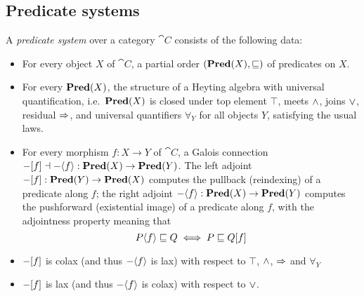 \subsection{Predicate systems}
\label{sec:predicate-system}

A \emph{predicate system} over a category $\cat{C}$ consists of the following data:
\begin{itemize}
\item For every object $X$ of $\cat{C}$, a partial order $(\mathbf{Pred}(X), \sqsubseteq)$ of predicates on $X$.
\item For every $\mathbf{Pred}(X)$, the structure of a Heyting algebra  with universal
   quantification, i.e.~$\mathbf{Pred}(X)$ is closed under top element $\top$, meets $\wedge$, joins $\vee$, residual
   $\Rightarrow$, and universal quantifiers $\forall_Y$ for all objects $Y$, satisfying the usual laws.
\item For every morphism $f: X \to Y$ of $\cat{C}$, a Galois connection $-[f] \dashv
-\langle f\rangle : \mathbf{Pred}(X) \to \mathbf{Pred}(Y)$. The left adjoint $-[f]: \mathbf{Pred}(Y) \to \mathbf{Pred}(X)$ computes
the pullback (reindexing) of a predicate along $f$; the right adjoint $-\langle f\rangle: \mathbf{Pred}(X) \to
\mathbf{Pred}(Y)$ computes the pushforward (existential image) of a predicate along $f$, with the adjointness property
meaning that
\[P\langle f\rangle \sqsubseteq Q \iff P \sqsubseteq Q[f] \]
\item $-[f]$ is colax (and thus $-\langle f\rangle$ is lax) with respect to $\top$, $\wedge$,
$\Rightarrow$ and $\forall_Y$
\item $-[f]$ is lax (and thus $-\langle f\rangle$ is colax) with respect to $\vee$.
\end{itemize}
